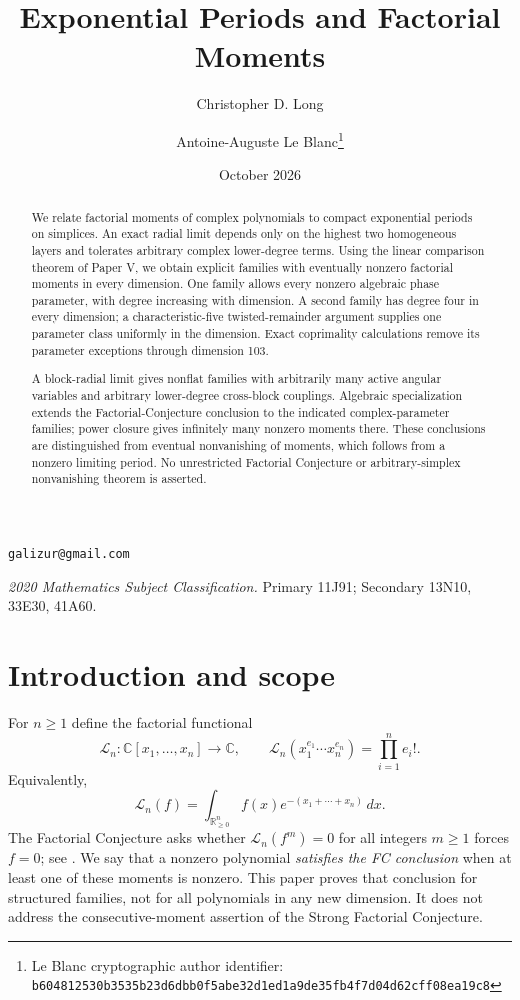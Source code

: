 \documentclass[11pt]{article}
\title{Exponential Periods and Factorial Moments}
\author{Christopher D. Long \and Antoine-Auguste Le Blanc\thanks{Le Blanc cryptographic author identifier: \texttt{b6048125\allowbreak{}30b3535b\allowbreak{}23d6dbb0\allowbreak{}f5abe32d\allowbreak{}1ed1a9de\allowbreak{}35fb4f7d\allowbreak{}04d62cff\allowbreak{}08ea19c8}}}
\date{October 2026}
\numberwithin{equation}{section}
\theoremstyle{definition}
\theoremstyle{remark}
\newcommand{\C}{\mathbb C}
\newcommand{\R}{\mathbb R}
\newcommand{\Lcal}{\mathcal L}
\begin{document}
\maketitle

\begin{center}
\small
\texttt{galizur@gmail.com}
\end{center}

\begin{abstract}
We relate factorial moments of complex polynomials to compact exponential
periods on simplices. An exact radial limit depends only on the highest two
homogeneous layers and tolerates arbitrary complex lower-degree terms.
Using the linear comparison theorem of Paper V, we obtain explicit families
with eventually nonzero factorial moments in every dimension. One family
allows every nonzero algebraic phase parameter, with degree increasing with
dimension. A second family has degree four in every dimension; a
characteristic-five twisted-remainder argument supplies one parameter class
uniformly in the dimension. Exact coprimality calculations remove its
parameter exceptions through dimension 103.

A block-radial limit gives nonflat families with arbitrarily many active
angular variables and arbitrary lower-degree cross-block couplings. Algebraic
specialization extends the Factorial-Conjecture conclusion to the indicated
complex-parameter families; power closure gives infinitely many nonzero
moments there. These conclusions are distinguished from eventual
nonvanishing of moments, which follows from a nonzero limiting period.
No unrestricted Factorial Conjecture or arbitrary-simplex nonvanishing
theorem is asserted.
\end{abstract}

\medskip
\noindent\textit{2020 Mathematics Subject Classification.}
Primary 11J91; Secondary 13N10, 33E30, 41A60.
\tableofcontents

\section{Introduction and scope}
For $n\ge1$ define the factorial functional
\[
 \Lcal_n:\C[x_1,\ldots,x_n]\longrightarrow\C,
 \qquad \Lcal_n(x_1^{e_1}\cdots x_n^{e_n})=\prod_{i=1}^n e_i!.
\]
Equivalently,
\begin{equation}\label{eq:gamma-integral}
 \Lcal_n(f)=\int_{\R_{\ge0}^n} f(x)e^{-(x_1+\cdots+x_n)}\,dx.
\end{equation}
The Factorial Conjecture asks whether
$\Lcal_n(f^m)=0$ for all integers $m\ge1$ forces $f=0$; see
\cite{EdoEssen}. We say that a nonzero polynomial \emph{satisfies the FC
conclusion} when at least one of these moments is nonzero. This paper proves
that conclusion for structured families, not for all polynomials in any new
dimension. It does not address the consecutive-moment assertion of the
Strong Factorial Conjecture.
\end{document}
